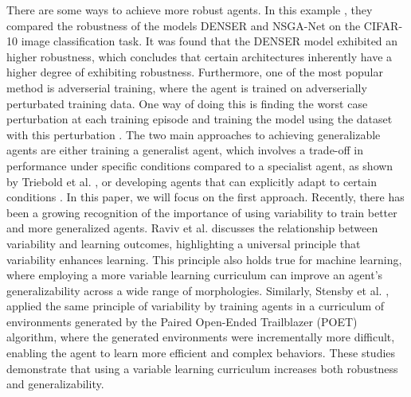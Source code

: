 There are some ways to achieve more robust agents. In this example \cite{Ines_Valentin_2022}, they compared the robustness of the models DENSER and NSGA-Net on the CIFAR-10 image classification task. It was found that the DENSER model exhibited an higher robustness, which concludes that certain architectures inherently have a higher degree of exhibiting robustness. Furthermore, one of the most popular method is adverserial training, where the agent is trained on adverserially perturbated training data. One way of doing this is finding the worst case perturbation at each training episode and training the model using the dataset with this perturbation \cite{Kai_Liang_Tan_2020}. The two main approaches to achieving generalizable agents are either training a generalist agent, which involves a trade-off in performance under specific conditions compared to a specialist agent, as shown by Triebold et al. \cite{Corinna_Triebold}, or developing agents that can explicitly adapt to certain conditions \cite{Charles_Packer_2019}. In this paper, we will focus on the first approach. Recently, there has been a growing recognition of the importance of using variability to train better and more generalized agents. Raviv et al. \cite{Limor_Raviv_2022} discusses the relationship between variability and learning outcomes, highlighting a universal principle that variability enhances learning. This principle also holds true for machine learning, where employing a more variable learning curriculum can improve an agent's generalizability across a wide range of morphologies. Similarly, Stensby et al. \cite{Emma_Stensby_2021}, applied the same principle of variability by training agents in a curriculum of environments generated by the Paired Open-Ended Trailblazer (POET) algorithm, where the generated environments were incrementally more difficult, enabling the agent to learn more efficient and complex behaviors. These studies demonstrate that using a variable learning curriculum increases both robustness and generalizability.